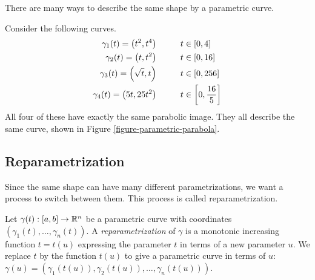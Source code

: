 \documentclass[fleqn,letterpaper]{report}
\begin{document}
There are many ways to describe the same shape by a parametric
curve. 

\begin{example}
\label{example-four-parametrizations}
Consider the following curves.
\begin{align*}
\gamma_1(t) = \left( t^2, t^4 \right) & \hspace{1.0cm} t \in [0,
4] \\
\gamma_2(t) = \left( t, t^2 \right) & \hspace{1.0cm} t \in [0,
16] \\
\gamma_3(t) = \left( \sqrt{t}, t \right) & \hspace{1.0cm} t \in [0,
256] \\
\gamma_4(t) = \left( 5t, 25t^2 \right) & \hspace{1.0cm} t \in
\left[0, \frac{16}{5} \right] \\
\end{align*}
All four of these have exactly the same parabolic image. They
all describe the same curve, shown in Figure
\ref{figure-parametric-parabola}.
\end{example}

\subsection{Reparametrization}
\label{reparametrization}

Since the same shape can have many different parametrizations,
we want a process to switch between them. This process is called
reparametrization. 

\begin{defn} 
Let $\gamma(t): [a,b] \rightarrow \mathbb{R}^n$ be a parametric
curve with coordinates $(\gamma_1(t), \ldots,
\gamma_n(t))$. A \emph{reparametrization} of $\gamma$ is a
monotonic increasing function $t = t(u)$ expressing the
parameter $t$ in terms of a new parameter $u$. We replace $t$
by the function $t(u)$ to give a parametric curve in terms of
$u$: $\gamma(u) = (\gamma_1(t(u)), \gamma_2(t(u)), \ldots,
\gamma_n(t(u)))$. 
\end{defn}
\end{document}
